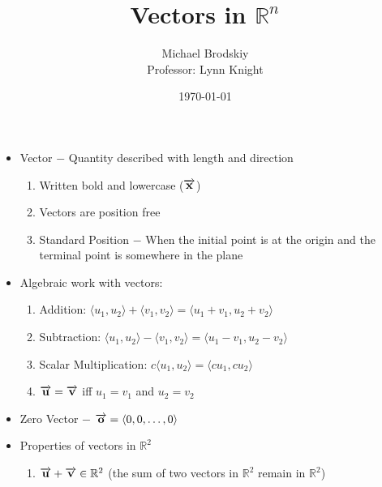 \documentclass[12pt]{article}
\title{Vectors in $\mathbb{R}^n$}
\date{\today}
\author{Michael Brodskiy\\ \small Professor: Lynn Knight}
\begin{document}
\maketitle

\begin{itemize}

  \item Vector $-$ Quantity described with length and direction

    \begin{enumerate}

      \item Written bold and lowercase ($\overrightarrow{\bold{x}}$)

      \item Vectors are position free

      \item Standard Position $-$ When the initial point is at the origin and the terminal point is somewhere in the plane

    \end{enumerate}

  \item Algebraic work with vectors:

    \begin{enumerate}

      \item Addition: $\langle u_1, u_2 \rangle + \langle v_1, v_2 \rangle= \langle u_1+v_1, u_2+v_2 \rangle$

      \item Subtraction: $\langle u_1, u_2 \rangle - \langle v_1, v_2 \rangle= \langle u_1-v_1, u_2-v_2 \rangle$

      \item Scalar Multiplication: $c\langle u_1, u_2 \rangle = \langle cu_1, cu_2 \rangle$

      \item $\overrightarrow{\bold{u}}=\overrightarrow{\bold{v}}$ iff $u_1=v_1$ and $u_2=v_2$

    \end{enumerate}

  \item Zero Vector $-$ $\overrightarrow{\bold{o}}=\langle 0, 0,\dots, 0\rangle$

  \item Properties of vectors in $\mathbb{R}^2$

    \begin{enumerate}

      \item $\overrightarrow{\bold{u}} + \overrightarrow{\bold{v}} \in \mathbb{R}^2$ (the sum of two vectors in $\mathbb{R}^2$ remain in $\mathbb{R}^2$)


\end{enumerate}
\end{itemize}
\end{document}
